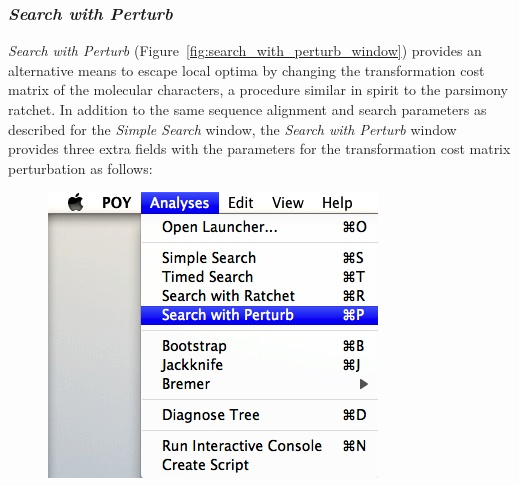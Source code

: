 {\subsubsection*{\emph{Search with Perturb}}

\emph{Search with Perturb} (Figure~\ref{fig:search_with_perturb_window}) provides an alternative means to escape local optima by changing the transformation cost matrix of the molecular characters, a procedure similar in spirit to the parsimony ratchet. In addition to the same sequence alignment and search parameters as described for the \emph{Simple Search} window, the \emph{Search with Perturb} window provides three extra fields with the parameters for the
transformation cost matrix perturbation as follows:

\begin{figure}
\centering
\begin{minipage}[c]{0.45\textwidth}
   		\includegraphics[width=\textwidth]{doc/figures/searchwithperturb_menu.jpg}
\end{minipage}
\,
\begin{minipage}[c]{0.52\textwidth}

\end{minipage}
\end{figure}}
